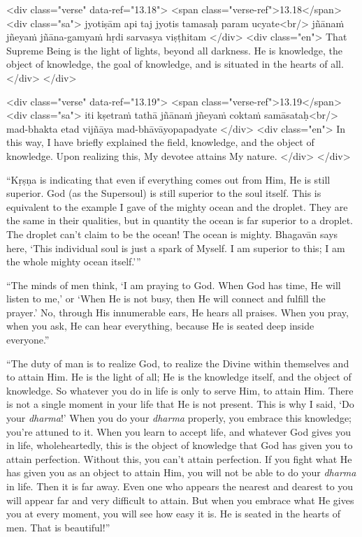 \begin{html}
<div class="verse" data-ref="13.18">
  <span class="verse-ref">13.18</span>
  <div class="sa">
    jyotiṣām api taj jyotis tamasaḥ param ucyate<br/>
    jñānaṁ jñeyaṁ jñāna-gamyaṁ hṛdi sarvasya viṣṭhitam
  </div>
  <div class="en">
    That Supreme Being is the light of lights, beyond all darkness. He is knowledge, the object of knowledge, the goal of knowledge, and is situated in the hearts of all.
  </div>
</div>
\end{html}



\begin{html}
<div class="verse" data-ref="13.19">
  <span class="verse-ref">13.19</span>
  <div class="sa">
    iti kṣetraṁ tathā jñānaṁ jñeyaṁ coktaṁ samāsataḥ<br/>
    mad-bhakta etad vijñāya mad-bhāvāyopapadyate
  </div>
  <div class="en">
    In this way, I have briefly explained the field, knowledge, and the object of knowledge. Upon realizing this, My devotee attains My nature.
  </div>
</div>
\end{html}


\enquote{Kṛṣṇa is indicating that even if everything comes out from Him, He is still superior. God (as the Supersoul) is still superior to the soul itself. This is equivalent to the example I gave of the mighty ocean and the droplet. They are the same in their qualities, but in quantity the ocean is far superior to a droplet. The droplet can’t claim to be the ocean! The ocean is mighty. Bhagavān says here, \enquote{This individual soul is just a spark of Myself. I am superior to this; I am the whole mighty ocean itself.}}

\enquote{The minds of men think, \enquote{I am praying to God. When God has time, He will listen to me,} or \enquote{When He is not busy, then He will connect and fulfill the prayer.} No, through His innumerable ears, He hears all praises. When you pray, when you ask, He can hear everything, because He is seated deep inside everyone.}

\enquote{The duty of man is to realize God, to realize the Divine within themselves and to attain Him. He is the light of all; He is the knowledge itself, and the object of knowledge. So whatever you do in life is only to serve Him, to attain Him. There is not a single moment in your life that He is not present. This is why I said, \enquote{Do your \textit{dharma}!} When you do your \textit{dharma} properly, you embrace this knowledge; you’re attuned to it. When you learn to accept life, and whatever God gives you in life, wholeheartedly, this is the object of knowledge that God has given you to attain perfection. Without this, you can’t attain perfection. If you fight what He has given you as an object to attain Him, you will not be able to do your \textit{dharma} in life. Then it is far away. Even one who appears the nearest and dearest to you will appear far and very difficult to attain. But when you embrace what He gives you at every moment, you will see how easy it is. He is seated in the hearts of men. That is beautiful!}

